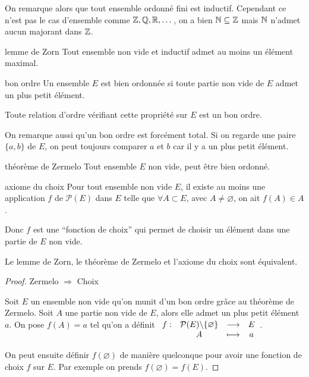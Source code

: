 On remarque alors que tout ensemble ordonné fini est inductif. 
Cependant ce n'est pas le cas d'ensemble comme $\mathbb{Z}, \mathbb{Q}, \mathbb{R}, \dots$,
on a bien $\mathbb{N} \subseteq \mathbb{Z}$ mais $\mathbb{N}$ n'admet aucun majorant dans $\mathbb{Z}$.

\begin{theorem}{lemme de Zorn}{}
    Tout ensemble non vide et inductif admet au moins un élément maximal.
\end{theorem}

\begin{definition}{bon ordre}{}
    Un ensemble $E$ est bien ordonnée si toute partie non vide de $E$ admet un plus petit élément. 
    
    Toute relation d'ordre vérifiant cette propriété sur $E$ est un bon ordre.
\end{definition}

On remarque aussi qu'un bon ordre est forcément total. 
Si on regarde une paire $\{a,b\}$ de $E$, on peut toujours comparer $a$ et $b$ car il y a un plus petit élément.

\begin{theorem}{théorème de Zermelo}{}
    Tout ensemble $E$ non vide, peut être bien ordonné.
\end{theorem}

\begin{theorem}{axiome du choix}{}
    Pour tout ensemble non vide $E$, il existe au moins une application $f$ de $\mathcal{P}(E)$ dans $E$ 
    telle que $\forall A \subset E$, avec $A \neq \varnothing$, on ait $f(A) \in A$.
\end{theorem}

Donc $f$ est une ``fonction de choix'' qui permet de choisir un élément dans une partie de $E$ non vide.

\begin{proposition}{}{}
    Le lemme de Zorn, le théorème de Zermelo et l'axiome du choix sont équivalent.
\end{proposition}

\begin{proof}
    Zermelo $\Longrightarrow$ Choix

    Soit $E$ un ensemble non vide qu'on munit d'un bon ordre grâce au théorème de Zermelo.
    Soit $A$ une partie non vide de $E$, alors elle admet un plus petit élément $a$.
    On pose $f(A) = a$ tel qu'on a définit $\begin{array}[t]{cccc}f : &  \mathcal{P}(E)\backslash \{ \varnothing \}  & \longrightarrow & E \\ & A & \longmapsto & a\end{array}$.

    On peut ensuite définir $f(\varnothing)$ de manière quelconque pour avoir une fonction de choix $f$ sur $E$.
    Par exemple on prends $f(\varnothing) = f(E)$.

\end{proof}

